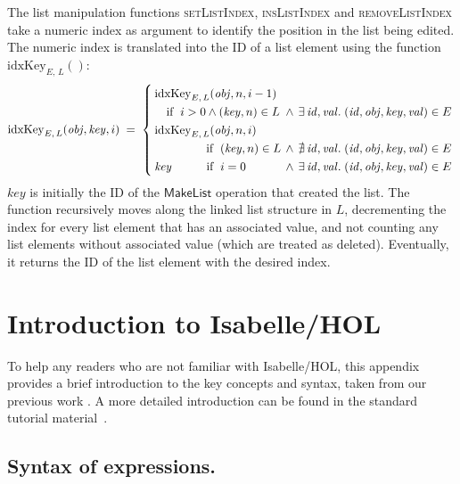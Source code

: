 The list manipulation functions \textsc{setListIndex}, \textsc{insListIndex} and \textsc{removeListIndex} take a numeric index as argument to identify the position in the list being edited.
The numeric index is translated into the ID of a list element using the function $\mathrm{idxKey}_{E,\, L}()$:
\[ \mathrm{idxKey}_{E,\, L}(\mathit{obj}, \mathit{key}, i) \;=\; \left\{
   \arraycolsep=2pt \def\arraystretch{1.3}
   \begin{array}{llllll}
       \mathrm{idxKey}_{E,\, L}(\mathit{obj}, n, i-1) \\
       \quad\text{if }\; i > 0 \wedge (\mathit{key}, n) \in L & \wedge &
       \exists\,\mathit{id}, \mathit{val}.\; (\mathit{id}, \mathit{obj}, \mathit{key}, \mathit{val}) \in E \\
       \mathrm{idxKey}_{E,\, L}(\mathit{obj}, n, i) \\
       \quad \hphantom{i > 0 \;\wedge\;} \text{if }\; (\mathit{key}, n) \in L & \wedge &
       \nexists\,\mathit{id}, \mathit{val}.\; (\mathit{id}, \mathit{obj}, \mathit{key}, \mathit{val}) \in E \\
       \mathit{key} \hspace{29.5pt}\text{if }\; i = 0 & \wedge &
       \exists\,\mathit{id}, \mathit{val}.\; (\mathit{id}, \mathit{obj}, \mathit{key}, \mathit{val}) \in E \\
   \end{array} \right. \]
$\mathit{key}$ is initially the ID of the $\mathsf{MakeList}$ operation that created the list.
The function recursively moves along the linked list structure in $L$, decrementing the index for every list element that has an associated value, and not counting any list elements without associated value (which are treated as deleted).
Eventually, it returns the ID of the list element with the desired index.


\section{Introduction to Isabelle/HOL}
\label{sect:appendix:isabelle}

To help any readers who are not familiar with Isabelle/HOL, this appendix provides a brief introduction to the key concepts and syntax, taken from our previous work \cite{Gomes:2017gy}.
A more detailed introduction can be found in the standard tutorial material~\cite{DBLP:books/sp/NipkowK14}.

\subsection{Syntax of expressions.}

